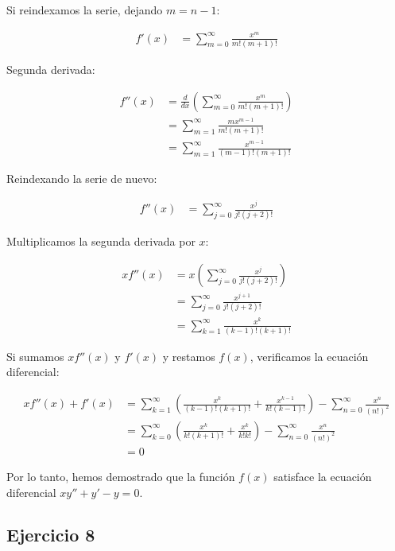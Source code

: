 \documentclass{article}
\begin{document}
    Si reindexamos la serie, dejando $m = n - 1$:

    \begin{align*}
    f'(x) &= \sum_{m=0}^{\infty} \frac{x^m}{m!(m+1)!}
    \end{align*}

    Segunda derivada:

    \begin{align*}
    f''(x) &= \frac{d}{dx} \left( \sum_{m=0}^{\infty} \frac{x^m}{m!(m+1)!} \right) \\
    &= \sum_{m=1}^{\infty} \frac{m x^{m-1}}{m!(m+1)!} \\
    &= \sum_{m=1}^{\infty} \frac{x^{m-1}}{(m-1)!(m+1)!}
    \end{align*}

    Reindexando la serie de nuevo:

    \begin{align*}
    f''(x) &= \sum_{j=0}^{\infty} \frac{x^j}{j!(j+2)!}
    \end{align*}

    Multiplicamos la segunda derivada por $x$:

    \begin{align*}
    x f''(x) &= x \left( \sum_{j=0}^{\infty} \frac{x^j}{j!(j+2)!} \right) \\
    &= \sum_{j=0}^{\infty} \frac{x^{j+1}}{j!(j+2)!} \\
    &= \sum_{k=1}^{\infty} \frac{x^k}{(k-1)!(k+1)!}
    \end{align*}

    Si sumamos $x f''(x)$ y $f'(x)$ y restamos $f(x)$, verificamos la ecuación diferencial:

    \begin{align*}
    x f''(x) + f'(x) &= \sum_{k=1}^{\infty} \left( \frac{x^k}{(k-1)!(k+1)!} + \frac{x^{k-1}}{k!(k-1)!} \right) - \sum_{n=0}^{\infty} \frac{x^n}{(n!)^2} \\
    &= \sum_{k=0}^{\infty} \left( \frac{x^k}{k!(k+1)!} + \frac{x^k}{k!k!} \right) - \sum_{n=0}^{\infty} \frac{x^n}{(n!)^2} \\
    &= 0
    \end{align*}

    Por lo tanto, hemos demostrado que la función $f(x)$ satisface la ecuación diferencial $x y'' + y' - y = 0$.

    \subsection*{Ejercicio 8}
\end{document}
